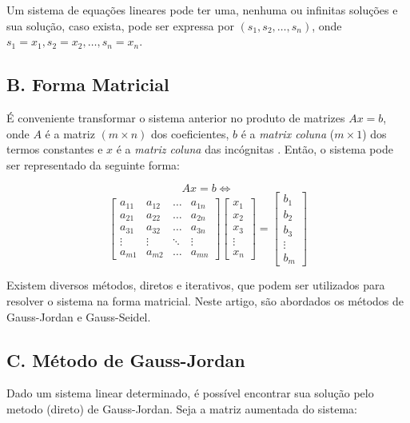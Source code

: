 \documentclass[twocolumn, 10pt]{extarticle}
\begin{document}
Um sistema de equações lineares pode ter uma, nenhuma ou infinitas soluções \cite[p. 4]{antonAlgebra} e sua solução, caso exista, pode ser expressa por $(s_1, s_2,\dots, s_n)$, onde $s_1 = x_1, s_2 = x_2, \dots, s_n = x_n$.

\subsection*{B. \quad Forma Matricial}

É conveniente transformar o sistema anterior no produto de matrizes $Ax = b$, onde $A$ é a matriz $(m \times n)$ dos coeficientes, $b$ é a \textit{matrix coluna} ($m \times 1$) dos termos constantes e $x$ é a \textit{matriz coluna} das incógnitas \cite[p. 33]{antonAlgebra}. Então, o sistema pode ser representado da seguinte forma:

\[Ax = b \iff\]
\[ 
\begin{bmatrix}
a_{11} & a_{12} & \dots & a_{1n} \\
a_{21} & a_{22} & \dots & a_{2n} \\
a_{31} & a_{32} & \dots & a_{3n} \\
\vdots & \vdots & \ddots & \vdots \\
a_{m1} & a_{m2} & \dots & a_{mn}  
\end{bmatrix}
\begin{bmatrix}
x_{1}\\
x_{2}\\
x_{3}\\
\vdots\\
x_{n}
\end{bmatrix}
=
\begin{bmatrix}
b_{1}\\
b_{2}\\
b_{3}\\
\vdots\\
b_{m}
\end{bmatrix}
\]

Existem diversos métodos, diretos e iterativos, que podem ser utilizados para resolver o sistema na forma matricial. Neste artigo, são abordados os métodos de Gauss-Jordan e Gauss-Seidel.

\subsection*{C. \quad Método de Gauss-Jordan}

Dado um sistema linear determinado, é possível encontrar sua solução pelo metodo (direto) de Gauss-Jordan. Seja a matriz aumentada do sistema:
\end{document}
